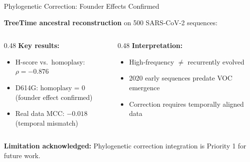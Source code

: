 \documentclass[aspectratio=169,11pt]{beamer}
\begin{document}
\begin{frame}{Phylogenetic Correction: Founder Effects Confirmed}

\textbf{TreeTime ancestral reconstruction} on 500 SARS-CoV-2 sequences:

\vspace{0.5em}
\begin{columns}[T]
\begin{column}{0.48\textwidth}
\textbf{Key results:}
\begin{itemize}
  \item H-score vs.\ homoplasy: $\rho = -0.876$
  \item D614G: homoplasy = 0\\(founder effect confirmed)
  \item Real data MCC: $-0.018$\\(temporal mismatch)
\end{itemize}
\end{column}

\begin{column}{0.48\textwidth}
\textbf{Interpretation:}
\begin{itemize}
  \item High-frequency $\neq$ recurrently evolved
  \item 2020 early sequences predate VOC emergence
  \item Correction requires temporally aligned data
\end{itemize}
\end{column}
\end{columns}

\vspace{1em}
\begin{center}
\colorbox{stage2orange!10}{\parbox{0.8\textwidth}{\centering
\textbf{Limitation acknowledged:} Phylogenetic correction integration is Priority 1 for future work.
}}
\end{center}
\end{frame}
\end{document}
